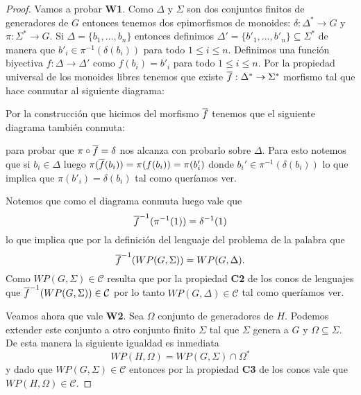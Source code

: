 \documentclass[tesis.tex]{subfiles}
\begin{document}
\begin{proof}
	Vamos a probar \textbf{W1}.
	Como $\Delta$ y $\Sigma$ son dos conjuntos finitos de generadores de $G$ entonces tenemos dos epimorfismos de monoides:
	$\delta: \Delta^* \to G$ y $\pi:\Sigma^* \to G$.
	Si $\Delta = \{ b_{1}, \dots, b_{n} \}$ entonces definimos $\Delta' = \{ b'_{1}, \dots, b'_{n}   \} \subseteq \Sigma^*$ de manera que $b'_{i} \in \pi^{-1}(\delta(b_{i}))$ para todo $1 \le i \le n$.
	Definimos una función biyectiva $f:\Delta \to \Delta'$ como $f(b_{i}) = b'_{i}$ para todo $1 \le i \le n$.
	Por la propiedad universal de los monoides libres tenemos que existe $\overline f: \Delta^* \to \Sigma^*$ morfismo tal que hace conmutar al siguiente diagrama:
	\begin{center}
	\end{center}
	
	Por la construcción que hicimos del morfismo $\overline f$ tenemos que el siguiente diagrama también conmuta:
	\begin{center}
	\end{center}
	para probar que $\pi \circ \overline f = \delta$ nos alcanza con probarlo sobre $\Delta$.
	Para esto notemos que si $b_{i} \in \Delta$ luego $\pi(\overline f(b_{i})) = \pi(f(b_{i})) = \pi(b_{i}')$ donde $b_{i}' \in \pi^{-1}(\delta(b_{i}))$ lo que implica que $\pi(b'_{i}) = \delta(b_{i})$ tal como queríamos ver.
	
	
	Notemos que como el diagrama conmuta luego vale que 
	\[
	\overline{f}^{-1}(\pi^{-1}(1)) = \delta^{-1}(1)
	\]
	lo que implica que por la definición del lenguaje del problema de la palabra que
	\[
	\overline{f}^{-1}(WP(G,\Sigma)) = WP(G, \Delta).
	\]
	Como $WP(G, \Sigma) \in \mathcal{C}$ resulta que por la propiedad \textbf{C2} de los conos de lenguajes que $\overline{f}^{-1}(WP(G,\Sigma)) \in \mathcal{C}$ por lo tanto $WP(G, \Delta) \in \mathcal{C}$ tal como queríamos ver.
	
	Veamos ahora que vale \textbf{W2}. 
	Sea $\Omega$ conjunto de generadores de $H$.
	Podemos extender este conjunto a otro conjunto finito $\Sigma$ tal que $\Sigma$ genera a $G$ y $\Omega \subseteq \Sigma$. 
	De esta manera la siguiente igualdad es inmediata
	\[
	WP(H, \Omega) = WP(G, \Sigma) \cap \Omega^*
	\]
	y dado que $WP(G, \Sigma) \in \mathcal{C}$ entonces por la propiedad \textbf{C3} de los conos vale que $WP(H, \Omega) \in \mathcal{C}$.
	
\end{proof}
\end{document}

